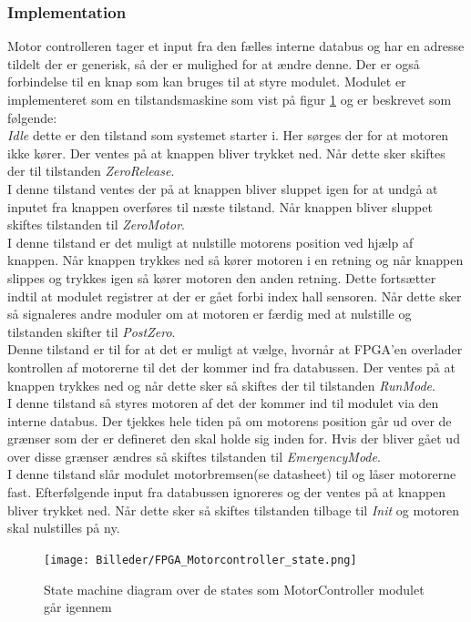 \subsubsection{Implementation}
Motor controlleren tager et input fra den fælles interne databus og har en adresse tildelt der er generisk, så der er mulighed for at ændre denne. Der er også forbindelse til en knap som kan bruges til at styre modulet. Modulet er implementeret som en tilstandsmaskine som vist på figur \ref{fig:FPGA_MotorController_State} og er beskrevet som følgende:\\
\textit{Idle} dette er den tilstand som systemet starter i. Her sørges der for at motoren ikke kører. Der ventes på at knappen bliver trykket ned. Når dette sker skiftes der til tilstanden \textit{ZeroRelease}.\\
I denne tilstand ventes der på at knappen bliver sluppet igen for at undgå at inputet fra knappen overføres til næste tilstand. Når knappen bliver sluppet skiftes tilstanden til \textit{ZeroMotor}.\\ 
I denne tilstand er det muligt at nulstille motorens position ved hjælp af knappen. Når knappen trykkes ned så kører motoren i en retning og når knappen slippes og trykkes igen så kører motoren den anden retning. Dette fortsætter indtil at modulet registrer at der er gået forbi index hall sensoren. Når dette sker så signaleres andre moduler om at motoren er færdig med at nulstille og tilstanden skifter til \textit{PostZero}.\\
Denne tilstand er til for at det er muligt at vælge, hvornår at FPGA'en overlader kontrollen af motorerne til det der kommer ind fra databussen. Der ventes på at knappen trykkes ned og når dette sker så skiftes der til tilstanden \textit{RunMode}. \\
I denne tilstand så styres motoren af det der kommer ind til modulet via den interne databus. Der tjekkes hele tiden på om motorens position går ud over de grænser som der er defineret den skal holde sig inden for. Hvis der bliver gået ud over disse grænser ændres så skiftes tilstanden til \textit{EmergencyMode}.\\
I denne tilstand slår modulet motorbremsen(se datasheet\cite{L6203}) til og låser motorerne fast. Efterfølgende input fra databussen ignoreres og der ventes på at knappen bliver trykket ned. Når dette sker så skiftes tilstanden tilbage til \textit{Init} og motoren skal nulstilles på ny.

\begin{figure}[ht]
	\begin{center}
		\texttt{[image: Billeder/FPGA\_Motorcontroller\_state.png]}
	\end{center}
\caption{State machine diagram over de states som MotorController modulet går igennem}
\label{fig:FPGA_MotorController_State}
\end{figure}

